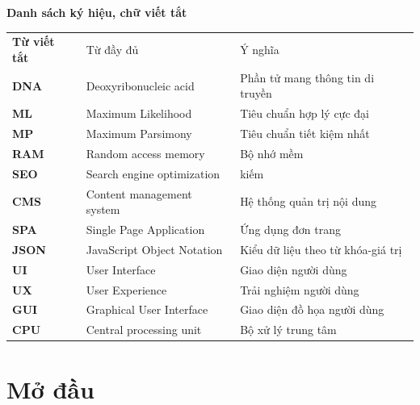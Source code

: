 \documentclass[12pt]{report}
\begin{document}
\newpage
{}
\begin{flushleft}
\bfseries{\Huge{Danh sách ký hiệu, chữ viết tắt}}
\end{flushleft}
\begin{table}[h]
	\centering
	\begin{tabular}{lll}
	    \textbf{Từ viết tắt}  & Từ đầy đủ & Ý nghĩa \\[0.3cm]
		\textbf{DNA}  & Deoxyribonucleic acid & Phần tử mang thông tin di truyền \\[0.3cm]
		\textbf{ML}  & Maximum Likelihood  & Tiêu chuẩn hợp lý cực đại \\[0.3cm]
		\textbf{MP}  & Maximum Parsimony & Tiêu chuẩn tiết kiệm nhất \\[0.3cm]
		\textbf{RAM}  & Random access memory & Bộ nhớ mềm \\[0.3cm]
		\textbf{SEO}  & Search engine optimization  & kiếm \\[0.3cm]
		\textbf{CMS}  & Content management system & Hệ thống quản trị nội dung \\[0.3cm]
		\textbf{SPA}  & Single Page Application & Ứng dụng đơn trang \\[0.3cm]
		\textbf{JSON}  & JavaScript Object Notation & Kiểu dữ liệu theo từ khóa-giá trị \\[0.3cm]
		\textbf{UI}  & User Interface  & Giao diện người dùng \\[0.3cm]
		\textbf{UX}  & User Experience  & Trải nghiệm người dùng \\[0.3cm]
		\textbf{GUI}  & Graphical User Interface & Giao diện đồ họa người dùng \\[0.3cm]
		\textbf{CPU}  & Central processing unit & Bộ xử lý trung tâm \\[0.3cm]
	\end{tabular}
\end{table}

\newpage
{}
\listoffigures

\newpage
{}
\setcounter{page}{1}
\chapter{Mở đầu}
\label{chap:intro}
\end{document}

